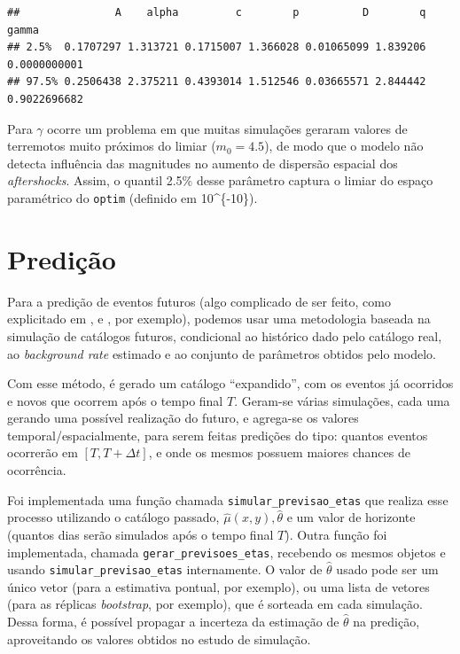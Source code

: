 \documentclass[11pt,]{article}
\begin{document}
\begin{verbatim}
##               A    alpha         c        p          D        q        gamma
## 2.5%  0.1707297 1.313721 0.1715007 1.366028 0.01065099 1.839206 0.0000000001
## 97.5% 0.2506438 2.375211 0.4393014 1.512546 0.03665571 2.844442 0.9022696682
\end{verbatim}

Para \(\gamma\) ocorre um problema em que muitas simulações geraram
valores de terremotos muito próximos do limiar (\(m_{0} = 4.5\)), de
modo que o modelo não detecta influência das magnitudes no aumento de
dispersão espacial dos \emph{aftershocks}. Assim, o quantil 2.5\% desse
parâmetro captura o limiar do espaço paramétrico do \texttt{optim}
(definido em 10\^{}\{-10\}).

\hypertarget{prediuxe7uxe3o}{%
\section{Predição}\label{prediuxe7uxe3o}}

Para a predição de eventos futuros (algo complicado de ser feito, como
explicitado em \cite{Veen_2008}, \cite{Ogata_1988} e \cite{Ogata_1998},
por exemplo), podemos usar uma metodologia baseada na simulação de
catálogos futuros, condicional ao histórico dado pelo catálogo real, ao
\emph{background rate} estimado e ao conjunto de parâmetros obtidos pelo
modelo.

Com esse método, é gerado um catálogo ``expandido'', com os eventos já
ocorridos e novos que ocorrem após o tempo final \(T\). Geram-se várias
simulações, cada uma gerando uma possível realização do futuro, e
agrega-se os valores temporal/espacialmente, para serem feitas predições
do tipo: quantos eventos ocorrerão em \([T, T + \Delta t]\), e onde os
mesmos possuem maiores chances de ocorrência.

Foi implementada uma função chamada \texttt{simular_previsao_etas} que
realiza esse processo utilizando o catálogo passado,
\(\hat{\mu}(x,y), \hat{\theta}\) e um valor de horizonte (quantos dias
serão simulados após o tempo final \(T\)). Outra função foi
implementada, chamada \texttt{gerar_previsoes_etas}, recebendo os mesmos
objetos e usando \texttt{simular_previsao_etas} internamente. O valor de
\(\hat{\theta}\) usado pode ser um único vetor (para a estimativa
pontual, por exemplo), ou uma lista de vetores (para as réplicas
\emph{bootstrap}, por exemplo), que é sorteada em cada simulação. Dessa
forma, é possível propagar a incerteza da estimação de \(\hat{\theta}\)
na predição, aproveitando os valores obtidos no estudo de simulação.
\end{document}
